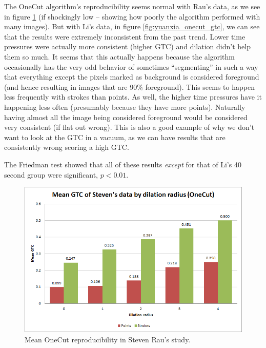 \documentclass[12pt,a4paper,notitlepage]{article}
\begin{document}
The OneCut algorithm's reproducibility seems normal with Rau's data, as we see in figure \ref{fig:steven_onecut_gtc} (if shockingly low -- showing how poorly the algorithm performed with many images). But with Li's data, in figure \ref{fig:yuanxia_onecut_gtc}, we can see that the results were extremely inconsistent from the past trend. Lower time pressures were actually more consistent (higher GTC) and dilation didn't help them so much. It seems that this actually happens because the algorithm occasionally has the very odd behavior of sometimes ``segmenting'' in such a way that everything except the pixels marked as background is considered foreground (and hence resulting in images that are 90\% foreground). This seems to happen less frequently with strokes than points. As well, the higher time pressures have it happening less often (presumably because they have more points). Naturally having almost all the image being considered foreground would be considered very consistent (if flat out wrong). This is also a good example of why we don't want to look at the GTC in a vacuum, as we can have results that are consistently wrong scoring a high GTC.

The Friedman test showed that all of these results \textit{except} for that of Li's 40 second group were significant, $p < 0.01$.

\begin{figure}[H]
	\includegraphics[width=.9\linewidth]{steven_onecut_gtc}
	\caption{Mean OneCut reproducibility in Steven Rau's study.}
	\label{fig:steven_onecut_gtc}
\end{figure}
\end{document}
